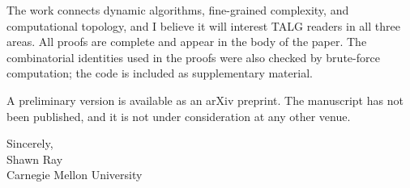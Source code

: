 \documentclass[11pt]{article}
\begin{document}
The work connects dynamic algorithms, fine-grained complexity, and computational topology, and I believe it will interest TALG readers in all three areas. All proofs are complete and appear in the body of the paper. The combinatorial identities used in the proofs were also checked by brute-force computation; the code is included as supplementary material.

A preliminary version is available as an arXiv preprint. The manuscript has not been published, and it is not under consideration at any other venue.

Sincerely,\\[1.2em]
Shawn Ray\\Carnegie Mellon University
\end{document}
